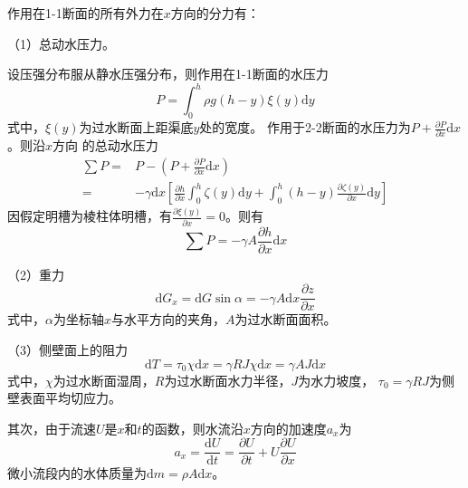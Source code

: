 作用在1-1断面的所有外力在$x$方向的分力有：

（1）总动水压力。

设压强分布服从静水压强分布，则作用在1-1断面的水压力
\begin{equation}
P
=
\int_{0}^{h}\! \rho g(h-y)\xi(y)\mathrm{d}y
\end{equation}
式中，$\xi(y)$为过水断面上距渠底$y$处的宽度。
作用于2-2断面的水压力为$P+\frac{\partial P}{\partial x}\mathrm{d}x$。则沿$x$方向
的总动水压力
\begin{equation}
  \begin{aligned}
    \sum P
    =&
    P - \left(P+\frac {\partial P} {\partial x}\mathrm{d}x\right)
    \\
    =&
    -\gamma \mathrm{d}x 
    \left[
      \frac{\partial h}{\partial x}
      \int_{0}^{h}\!
      \zeta(y)
      \mathrm{d}y
      +
      \int_{0}^{h}\!
      (h-y)
      \frac{\partial \zeta(y)}{\partial x}
      \mathrm{d}y
    \right]
  \end{aligned}
  \label{EqCGe_SVe_Me_Pressure}
\end{equation}
因假定明槽为棱柱体明槽，有$\frac{\partial \xi(y)}{\partial x}=0$。则有
\begin{equation}
\sum P
=
-\gamma A\frac{\partial h}{\partial x}\mathrm{d}x
\end{equation}

（2）重力
\begin{equation}
  \mathrm{d}G_{x}
  =
  \mathrm{d}G\sin\alpha
  =
  -\gamma A\mathrm{d}x\frac{\partial z}{\partial x}
\end{equation}
式中，$\alpha$为坐标轴$x$与水平方向的夹角，$A$为过水断面面积。

（3）侧壁面上的阻力
\begin{equation}
\mathrm{d}T
=
\tau_{0}\chi\mathrm{d}x
=
\gamma RJ\chi\mathrm{d}x
=
\gamma AJ\mathrm{d}x
\end{equation}
式中，$\chi$为过水断面湿周，$R$为过水断面水力半径，$J$为水力坡度，
$\tau_{0}=\gamma RJ$为侧壁表面平均切应力。

其次，由于流速$U$是$x$和$t$的函数，则水流沿$x$方向的加速度$a_{x}$为
\begin{equation}
  a_{x}
=
\frac{\mathrm{d} U}{\mathrm{d} t}
=
\frac{\partial U}{\partial t}
+
U
\frac{\partial U}{\partial x}
\end{equation}
微小流段内的水体质量为$\mathrm{d}m=\rho A\mathrm{d}x$。

